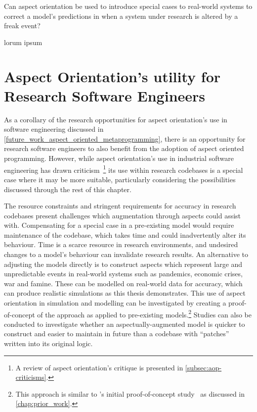 \begin{researchquestion}
Can aspect orientation be used to introduce special cases to real-world systems
to correct a model's predictions in when a system under research is altered by a
freak event?
\end{researchquestion}

lorum  ipsum


\section{Aspect Orientation's utility for Research Software Engineers}

As a corollary of the research opportunities for aspect orientation's use in
software engineering discussed in \cref{future_work_aspect_oriented_metaprogramming},
there is an opportunity for research software engineers to also benefit from the
adoption of aspect oriented programming. However, while aspect orientation's use
in industrial software engineering has drawn
criticism~\cite{steimann06paradoxical,przybylek2010wrong,Constantinides04aopconsidered}\footnote{A
review of aspect orientation's critique is presented in
\cref{subsec:aop-criticisms}.} its use within research codebases is a special
case where it may be more suitable, particularly considering the possibilities
discussed through the rest of this chapter.

The resource constraints and stringent requirements for accuracy in research
codebases present challenges which augmentation through aspects could
assist with. Compensating for a special case in a pre-existing model would
require maintenance of the codebase, which takes time and could inadvertently
alter its behaviour. Time is a scarce resource in research environments, and
undesired changes to a model's behaviour can invalidate research results. An
alternative to adjusting the models directly is to construct aspects which
represent large and unpredictable events in real-world systems such as
pandemics, economic crises, war and famine. These can be modelled on real-world
data for accuracy, which can produce realistic simulations as this thesis
demonstrates. This use of aspect orientation in simulation and modelling can be
investigated by creating a proof-of-concept of the approach as applied to
pre-existing models.\footnote{This approach is similar to \pdsf{}'s initial
proof-of-concept study~\cite{wallis2018caise} as discussed in
\cref{chap:prior_work}.} Studies can also be conducted to investigate whether an
aspectually-augmented model is quicker to construct and easier to maintain in
future than a codebase with ``patches'' written into its original logic.

